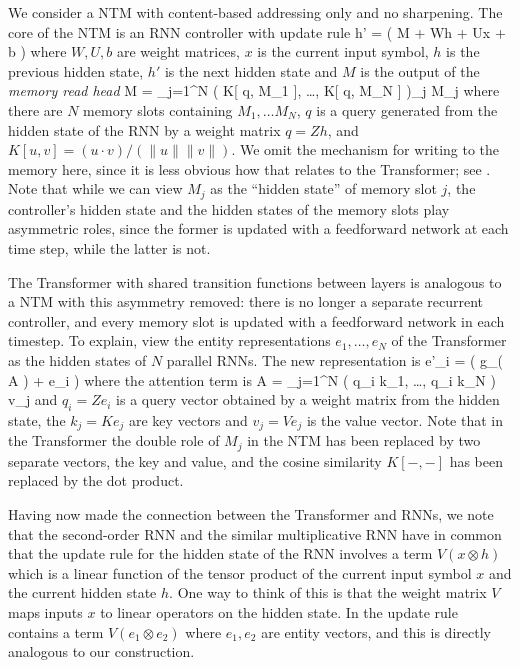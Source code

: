 \documentclass{article} %
\begin{document}
We consider a NTM with content-based addressing only and no sharpening. The core of the NTM is an RNN controller with update rule
\be
h' = ( M + Wh + Ux + b )
\ee
where $W, U, b$ are weight matrices, $x$ is the current input symbol, $h$ is the previous hidden state, $h'$ is the next hidden state and $M$ is the output of the \emph{memory read head}
\be
M = \sum_{j=1}^N ( K[ q, M_1 ], \ldots, K[ q, M_N ] )_j M_j
\ee
where there are $N$ memory slots containing $M_1, \ldots M_N$, $q$ is a query generated from the hidden state of the RNN by a weight matrix $q = Z h$, and $K[u,v] = (u \cdot v)/(\|u\| \|v\|)$. We omit the mechanism for writing to the memory here, since it is less obvious how that relates to the Transformer; see \cite[\S 3.2]{ntm}. Note that while we can view $M_j$ as the ``hidden state'' of memory slot $j$, the controller's hidden state and the hidden states of the memory slots play asymmetric roles, since the former is updated with a feedforward network at each time step, while the latter is not.

The Transformer with shared transition functions between layers is analogous to a NTM with this asymmetry removed: there is no longer a separate recurrent controller, and every memory slot is updated with a feedforward network in each timestep. To explain, view the entity representations $e_1, \ldots, e_N$ of the Transformer as the hidden states of $N$ parallel RNNs. The new representation is
\be
e'_i = ( g_\theta( A ) + e_i )
\ee
where the attention term is
\be
A = \sum_{j=1}^N ( q_i \cdot k_1, \ldots, q_i \cdot k_N ) v_j
\ee
and $q_i = Z e_i$ is a query vector obtained by a weight matrix from the hidden state, the $k_j = K e_j$ are key vectors and $v_j = V e_j$ is the value vector. Note that in the Transformer the double role of $M_j$ in the NTM has been replaced by two separate vectors, the key and value, and the cosine similarity $K[-,-]$ has been replaced by the dot product.

Having now made the connection between the Transformer and RNNs, we note that the second-order RNN \citep{highorderrec,pollack,firstvsecond,secondorder} and the similar multiplicative RNN \citep{sutskever,irsoy} have in common that the update rule for the hidden state of the RNN involves a term $V(x \otimes h)$ which is a linear function of the tensor product of the current input symbol $x$ and the current hidden state $h$. One way to think of this is that the weight matrix $V$ maps inputs $x$ to linear operators on the hidden state. In \citep{socher2013} the update rule contains a term $V( e_1 \otimes e_2 )$ where $e_1, e_2$ are entity vectors, and this is directly analogous to our construction.
\end{document}
